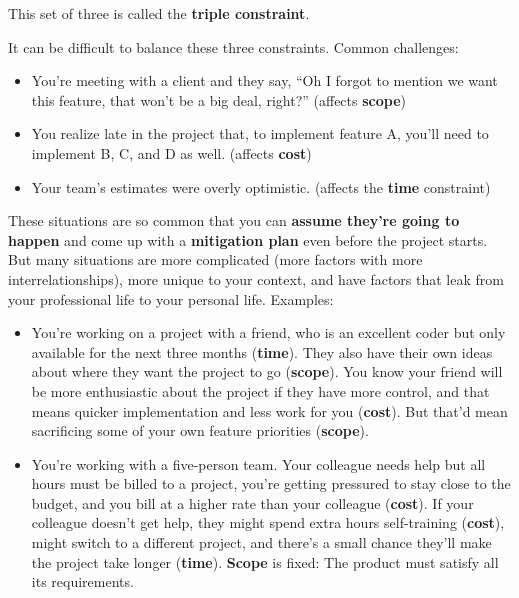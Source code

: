 This set of three is called the \textbf{triple constraint}.

It can be difficult to balance these three constraints. Common challenges:

\begin{itemize}
    \item You're meeting with a client and they say, ``Oh I forgot to mention we want this feature, that won't be a big deal, right?'' (affects \textbf{scope})
    \item You realize late in the project that, to implement feature A, you'll need to implement B, C, and D as well. (affects \textbf{cost})
    \item Your team's estimates were overly optimistic. (affects the \textbf{time} constraint)
\end{itemize}

These situations are so common that you can \textbf{assume they're going to happen} and come up with a \textbf{mitigation plan}\marginpar{\mitigationPlanDef} even before the project starts. But many situations are more complicated (more factors with more interrelationships), more unique to your context, and have factors that leak from your professional life to your personal life. Examples: \\

\begin{itemize}
    \item You're working on a project with a friend, who is an excellent coder but only available for the next three months (\textbf{time}). They also have their own ideas about where they want the project to go (\textbf{scope}). You know your friend will be more enthusiastic about the project if they have more control, and that means quicker implementation and less work for you (\textbf{cost}). But that'd mean sacrificing some of your own feature priorities (\textbf{scope}). \\
    \item You're working with a five-person team. Your colleague needs help but all hours must be billed to a project, you're getting pressured to stay close to the budget, and you bill at a higher rate than your colleague (\textbf{cost}). If your colleague doesn't get help, they might spend extra hours self-training (\textbf{cost}), might switch to a different project, and there's a small chance they'll make the project take longer (\textbf{time}). \textbf{Scope} is fixed: The product must satisfy all its requirements. \\
\end{itemize}

